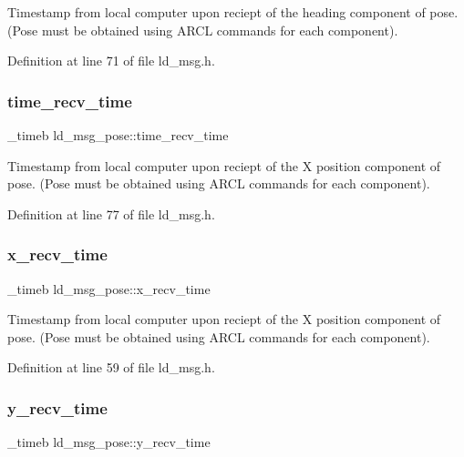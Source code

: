 Timestamp from local computer upon reciept of the heading component of pose. (Pose must be obtained using A\+R\+CL commands for each component). 

Definition at line 71 of file ld\+\_\+msg.\+h.

\mbox{\label{structld__msg__pose_a68a03febea822176935f8e14f1897b54}} 
\subsubsection{\texorpdfstring{time\+\_\+recv\+\_\+time}{time\_recv\_time}}
{\footnotesize\ttfamily \+\_\+timeb ld\+\_\+msg\+\_\+pose\+::time\+\_\+recv\+\_\+time}

Timestamp from local computer upon reciept of the X position component of pose. (Pose must be obtained using A\+R\+CL commands for each component). 

Definition at line 77 of file ld\+\_\+msg.\+h.

\mbox{\label{structld__msg__pose_a4a4636747213a18e34dc05b5ea964dfd}} 
\subsubsection{\texorpdfstring{x\+\_\+recv\+\_\+time}{x\_recv\_time}}
{\footnotesize\ttfamily \+\_\+timeb ld\+\_\+msg\+\_\+pose\+::x\+\_\+recv\+\_\+time}

Timestamp from local computer upon reciept of the X position component of pose. (Pose must be obtained using A\+R\+CL commands for each component). 

Definition at line 59 of file ld\+\_\+msg.\+h.

\mbox{\label{structld__msg__pose_a1ab8f32a7a2edd172e33057719dbe9e9}} 
\subsubsection{\texorpdfstring{y\+\_\+recv\+\_\+time}{y\_recv\_time}}
{\footnotesize\ttfamily \+\_\+timeb ld\+\_\+msg\+\_\+pose\+::y\+\_\+recv\+\_\+time}

